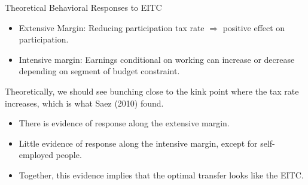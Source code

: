\documentclass[10pt]{extarticle}
\begin{document}
  \begin{problem}{Theoretical Behavioral Responses to EITC}
    \begin{center}
    \end{center}
    \begin{itemize}
      \item Extensive Margin: Reducing participation tax rate $\Rightarrow$ positive effect on participation.
      \item Intensive margin: Earnings conditional on working can increase or decrease depending on segment of budget constraint.
    \end{itemize}
    Theoretically, we should see bunching close to the kink point where the tax rate increases, which is what Saez (2010) found.
    \begin{itemize}
      \item There is evidence of response along the extensive margin.
      \item Little evidence of response along the intensive margin, except for self-employed people.
      \item Together, this evidence implies that the optimal transfer looks like the EITC.
    \end{itemize}
  \end{problem}
\end{document}
